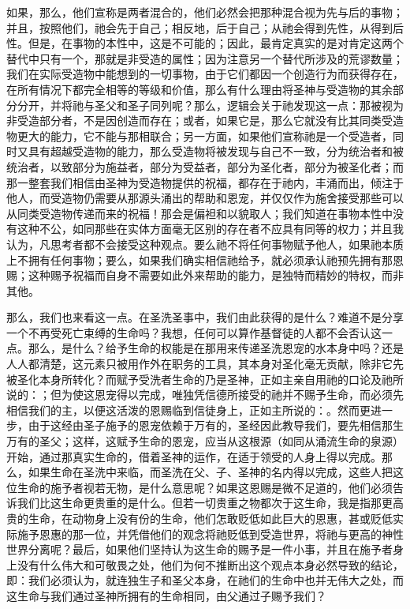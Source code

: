 如果，那么，他们宣称是两者混合的，他们必然会把那种混合视为先与后的事物；并且，按照他们，祂会先于自己；相反地，后于自己；从祂会得到先性，从得到后性。但是，在事物的本性中，这是不可能的；因此，最肯定真实的是对肯定这两个替代中只有一个，那就是非受造的属性；因为注意另一个替代所涉及的荒谬数量；我们在实际受造物中能想到的一切事物，由于它们都因一个创造行为而获得存在，在所有情况下都完全相等的等级和价值，那么有什么理由将圣神与受造物的其余部分分开，并将祂与圣父和圣子同列呢？那么，逻辑会关于祂发现这一点：那被视为非受造部分者，不是因创造而存在；或者，如果它是，那么它就没有比其同类受造物更大的能力，它不能与那相联合；另一方面，如果他们宣称祂是一个受造者，同时又具有超越受造物的能力，那么受造物将被发现与自己不一致，分为统治者和被统治者，以致部分为施益者，部分为受益者，部分为圣化者，部分为被圣化者；而那一整套我们相信由圣神为受造物提供的祝福，都存在于祂内，丰涌而出，倾注于他人，而受造物仍需要从那源头涌出的帮助和恩宠，并仅仅作为施舍接受那些可以从同类受造物传递而来的祝福！那会是偏袒和以貌取人；我们知道在事物本性中没有这种不公，如同那些在实体方面毫无区别的存在者不应具有同等的权力；并且我认为，凡思考者都不会接受这种观点。要么祂不将任何事物赋予他人，如果祂本质上不拥有任何事物；要么，如果我们确实相信祂给予，就必须承认祂预先拥有那恩赐；这种赐予祝福而自身不需要如此外来帮助的能力，是独特而精妙的特权，而非其他。\par

那么，我们也来看这一点。在圣洗圣事中，我们由此获得的是什么？难道不是分享一个不再受死亡束缚的生命吗？我想，任何可以算作基督徒的人都不会否认这一点。那么，是什么？给予生命的权能是在那用来传递圣洗恩宠的水本身中吗？还是人人都清楚，这元素只被用作外在职务的工具，其本身对圣化毫无贡献，除非它先被圣化本身所转化？而赋予受洗者生命的乃是圣神，正如主亲自用祂的口论及祂所说的：；但为使这恩宠得以完成，唯独凭信德所接受的祂并不赐予生命，而必须先相信我们的主，以便这活泼的恩赐临到信徒身上，正如主所说的：。然而更进一步，由于这经由圣子施予的恩宠依赖于万有的，圣经因此教导我们，要先相信那生万有的圣父；这样，这赋予生命的恩宠，应当从这根源（如同从涌流生命的泉源）开始，通过那真实生命的，借着圣神的运作，在适于领受的人身上得以完成。那么，如果生命在圣洗中来临，而圣洗在父、子、圣神的名内得以完成，这些人把这位生命的施予者视若无物，是什么意思呢？如果这恩赐是微不足道的，他们必须告诉我们比这生命更贵重的是什么。但若一切贵重之物都次于这生命，我是指那更高贵的生命，在动物身上没有份的生命，他们怎敢贬低如此巨大的恩惠，甚或贬低实际施予恩惠的那一位，并凭借他们的观念将祂贬低到受造世界，将祂与更高的神性世界分离呢？最后，如果他们坚持认为这生命的赐予是一件小事，并且在施予者身上没有什么伟大和可敬畏之处，他们为何不推断出这个观点本身必然导致的结论，即：我们必须认为，就连独生子和圣父本身，在祂们的生命中也并无伟大之处，而这生命与我们通过圣神所拥有的生命相同，由父通过子赐予我们？\par

